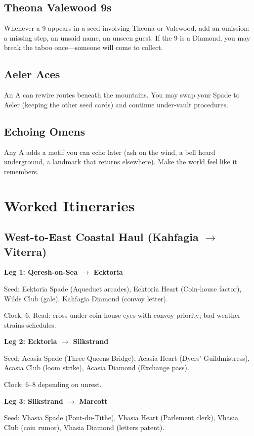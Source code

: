 \subsection{Theona Valewood 9s}
Whenever a 9 appears in a seed involving Theona or Valewood, add an omission: a missing step, an unsaid name, an unseen guest. If the 9 is a Diamond, you may break the taboo once---someone will come to collect.

\subsection{Aeler Aces}
An A can rewire routes beneath the mountains. You may swap your Spade to Aeler (keeping the other seed cards) and continue under-vault procedures.

\subsection{Echoing Omens}
Any A adds a motif you can echo later (ash on the wind, a bell heard underground, a landmark that returns elsewhere). Make the world feel like it remembers.

\section{Worked Itineraries}

\subsection{West-to-East Coastal Haul (Kahfagia $\rightarrow$ Viterra)}

\textbf{Leg 1: Qeresh-on-Sea $\rightarrow$ Ecktoria}

Seed: Ecktoria Spade (Aqueduct arcades), Ecktoria Heart (Coin-house factor), Wilds Club (gale), Kahfagia Diamond (convoy letter).

Clock: 6. Read: cross under coin-house eyes with convoy priority; bad weather strains schedules.

\textbf{Leg 2: Ecktoria $\rightarrow$ Silkstrand}

Seed: Acasia Spade (Three-Queens Bridge), Acasia Heart (Dyers' Guildmistress), Acasia Club (loom strike), Acasia Diamond (Exchange pass).

Clock: 6--8 depending on unrest.

\textbf{Leg 3: Silkstrand $\rightarrow$ Marcott}

Seed: Vhasia Spade (Pont-du-Tithe), Vhasia Heart (Parlement clerk), Vhasia Club (coin rumor), Vhasia Diamond (letters patent).

